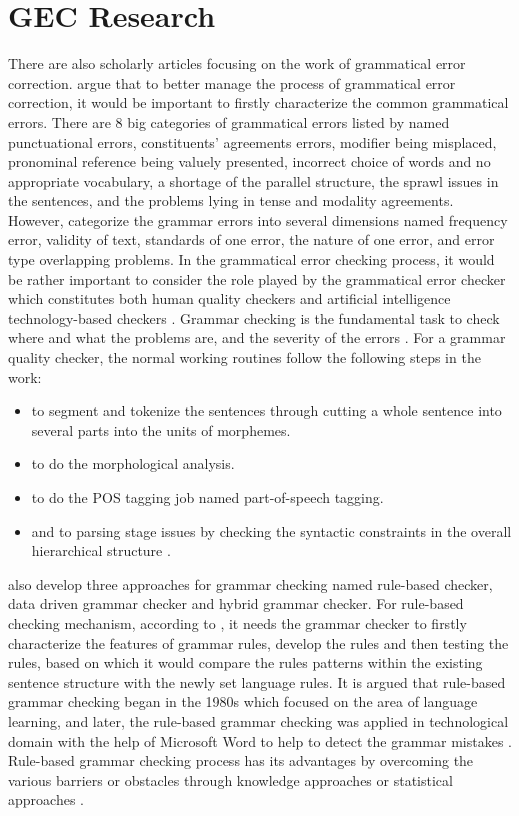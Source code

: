 \section{GEC Research}
There are also scholarly articles focusing on the work of grammatical error correction. \cite{bhirud2017grammar} argue that to better manage the process of grammatical error correction, it would be important to firstly characterize the common grammatical errors. There are 8 big categories of grammatical errors listed by \cite{bhirud2017grammar} named punctuational errors, constituents’ agreements errors, modifier being misplaced, pronominal reference being valuely presented, incorrect choice of words and no appropriate vocabulary, a shortage of the parallel structure, the sprawl issues in the sentences, and the problems lying in tense and modality agreements. However, \cite{soni2018systematic} categorize the grammar errors into several dimensions named frequency error, validity of text, standards of one error, the nature of one error, and error type overlapping problems. In the grammatical error checking process, it would be rather important to consider the role played by the grammatical error checker which constitutes both human quality checkers and artificial intelligence technology-based checkers \cite{bhirud2017grammar}. Grammar checking is the fundamental task to check where and what the problems are, and the severity of the errors \cite{bhirud2017grammar}. For a grammar quality checker, the normal working routines follow the following steps in the work: 
\begin{itemize}
    \item to segment and tokenize the sentences through cutting a whole sentence into several parts into the units of morphemes.
    \item to do the morphological analysis.
    \item to do the POS tagging job named part-of-speech tagging.
    \item and to parsing stage issues by checking the syntactic constraints in the overall hierarchical structure \cite{bhirud2017grammar}.
\end{itemize}

\cite{bhirud2017grammar} also develop three approaches for grammar checking named rule-based checker, data driven grammar checker and hybrid grammar checker. For rule-based checking mechanism, according to \cite{naber2003rule}, it needs the grammar checker to firstly characterize the features of grammar rules, develop the rules and then testing the rules, based on which it would compare the rules patterns within the existing sentence structure with the newly set language rules. It is argued that rule-based grammar checking began in the 1980s which focused on the area of language learning, and later, the rule-based grammar checking was applied in technological domain with the help of Microsoft Word to help to detect the grammar mistakes \cite{nazar2012google}. Rule-based grammar checking process has its advantages by overcoming the various barriers or obstacles through knowledge approaches or statistical approaches \cite{nazar2012google}. 

